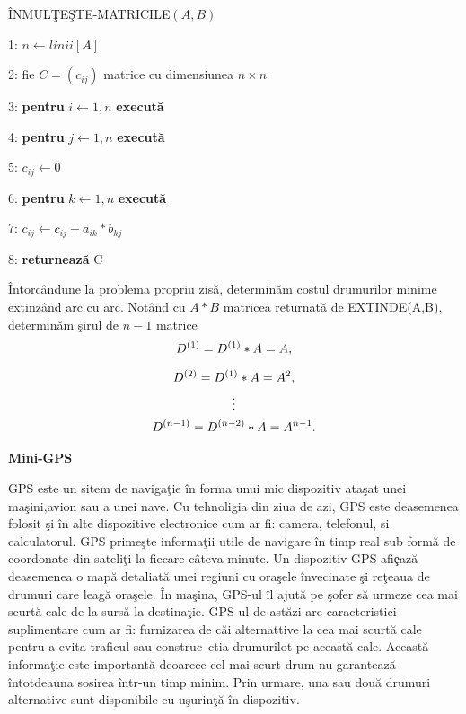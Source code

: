 \documentclass[11pt,a4paper]{report}
\begin{document}
          \vspace{0.3cm}
     \^ INMUL\c TE\c STE-MATRICILE$(A,B)$
     
     \vspace{0.1cm}
     1: $n\leftarrow linii[A]$
     
     2: fie $C=(c_{ij})$ matrice cu dimensiunea $n\times n$ 
     
     3: \textbf{pentru} $i\leftarrow 1,n$ \textbf{execut\u a}
     
     4: \hspace{0.6cm}\textbf{pentru} $j\leftarrow 1,n$ \textbf{execut\u a}
     
     5:\hspace{1.2cm} $c_{ij}\leftarrow 0$
     
     6:\hspace{1.2cm} \textbf{pentru} $k\leftarrow 1,n$ \textbf{execut\u a}
     
     7:\hspace{1.8cm} $c_{ij}\leftarrow c_{ij}+a_{ik}*b_{kj}$
     
     8: \textbf{returneaz\u a} C
     \vspace{0.3cm}
     
     \^ Intorc\^ andune la problema propriu zis\u a, determin\u am costul drumurilor minime  extinz\^ and arc cu arc. Not\^ and cu $A*B$ matricea returnat\u a de EXTINDE(A,B), determin\u am \c sirul de $n-1$ matrice
	\begin{gather*}
         D^{(1)}=D^{(1)}*A=A,\medskip\\
   		 D^{(2)}=D^{(1)}*A=A^{2},\\
   		 \vdots \\
   		 D^{(n-1)}=D^{(n-2)}*A=A^{n-1}.
	\end{gather*}
     
     
     \newpage
     \textbf{Mini-GPS}
     
    \vspace{0.2cm} GPS este un sitem de naviga\c tie \^ in forma unui mic dispozitiv ata\c sat unei ma\c sini,avion sau a unei nave. Cu tehnoligia din ziua de azi, GPS este deasemenea folosit \c si \^ in alte dispozitive electronice cum ar fi: camera, telefonul, si calculatorul. GPS prime\c ste informa\c tii utile de navigare \^ in timp real sub form\u a de coordonate din sateli\c ti la fiecare c\^ ateva minute. Un dispozitiv GPS afi\c eaz\u a deasemenea o map\u a detaliat\u a unei regiuni cu ora\c sele \^ invecinate \c si re\c teaua de drumuri care leag\u a ora\c sele. \^ In ma\c sina, GPS-ul \^ il ajut\u a pe \c sofer s\u a urmeze cea mai scurt\u a cale de la surs\u a la destina\c tie. GPS-ul de ast\u azi are caracteristici suplimentare cum ar fi: furnizarea de c\u ai alternattive la cea mai scurt\u a cale pentru a evita traficul sau construc\ ctia drumurilot pe aceast\u a cale. Aceast\u a informa\c tie este important\u a deoarece cel mai scurt drum nu garanteaz\u a \^ intotdeauna sosirea \^ intr-un timp minim. Prin urmare, una sau dou\u a drumuri alternative sunt disponibile cu u\c surin\c t\u a \^ in dispozitiv.
    
\end{document}
